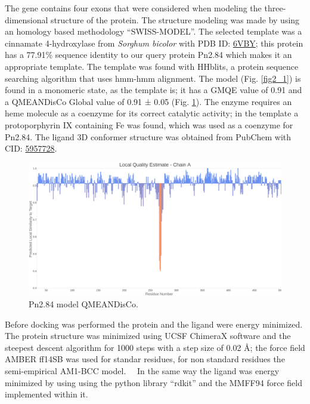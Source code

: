 \documentclass[12pt]{article}
\begin{document}
	The gene contains four exons that were considered when modeling the three-dimensional structure of the protein. The structure modeling was made by using an homology based methodology ``SWISS-MODEL''. \cite{swiss} The selected template was a cinnamate 4-hydroxylase from \textit{Sorghum bicolor} with PDB ID: \href{https://www.rcsb.org/structure/6VBY}{6VBY}; this protein has a 77.91\% sequence identity to our query protein Pn2.84 which makes it an appropriate template. The template was found with HHblits, a protein sequence searching algorithm that uses hmm-hmm alignment. \cite{hhblits} The model (Fig. \ref{fig2_1}) is found in a monomeric state, as the template is; it has a GMQE value of 0.91 and a QMEANDisCo Global value of 0.91 ± 0.05 (Fig. \ref{fig2_2}). \cite{qmeandisco_swiss} The enzyme requires an heme molecule as a coenzyme for its correct catalytic activity; in the template a protoporphyrin IX containing Fe was found, which was used as a coenzyme for Pn2.84. The ligand 3D conformer structure was obtained from PubChem with CID: \href{https://pubchem.ncbi.nlm.nih.gov/compound/5957728}{5957728}.
	
	
	\FloatBarrier
	\begin{figure}[h!]
		\centering
		\includegraphics[width=\textwidth-50pt]{../2/Swiss/Local_quality_estimate.png}
		\caption{\centering Pn2.84 model QMEANDisCo.}
		\label{fig2_2}
	\end{figure}
	\FloatBarrier
	
	Before docking was performed the protein and the ligand were energy minimized. The protein structure was minimized using UCSF ChimeraX software \cite{chimera,chimera_2} and the steepest descent algorithm for 1000 steps with a step size of 0.02 \r{A}; the force field AMBER ff14SB was used for standar residues, for non standard residues the semi-empirical AM1-BCC model. \cite{am1_bcc,am1_bcc_2,am1_bcc_3}\ \ In the same way the ligand was energy minimized by using using the python library ``rdkit'' and the MMFF94 force field implemented within it. \cite{rdkit,rdkit_mmff}
	
\end{document}
